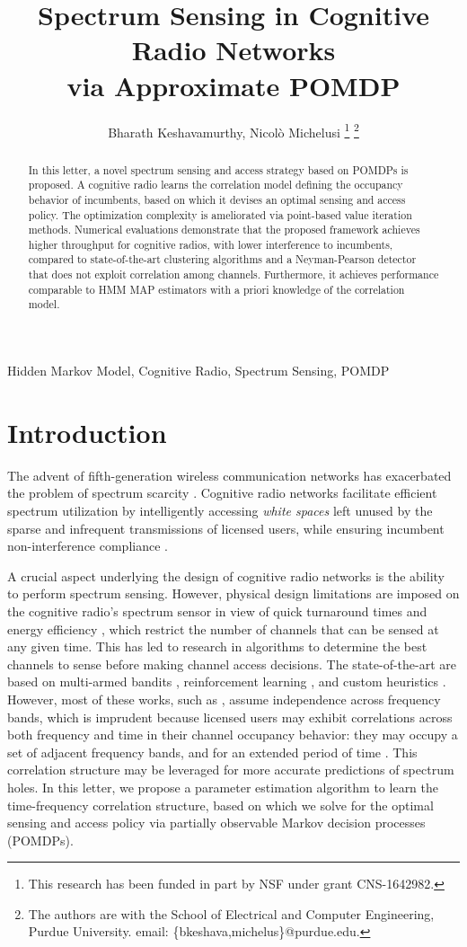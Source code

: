 \documentclass[10pt,twocolumn]{IEEEtran}
\title{Spectrum Sensing in Cognitive Radio Networks
\\
via Approximate POMDP}
\author{Bharath Keshavamurthy, Nicol\`{o} Michelusi
\thanks{This research has been funded in part by NSF under grant CNS-1642982.}
\thanks{The authors are with the School of Electrical and Computer Engineering, Purdue University. email: \{bkeshava,michelus\}@purdue.edu.}
\vspace{-12mm}}
\begin{document}
\maketitle
\thispagestyle{empty}
\pagestyle{empty} 
\begin{abstract}
In this letter, a novel spectrum sensing and access strategy based on POMDPs is proposed. A cognitive radio learns the correlation model defining the occupancy behavior of incumbents, based on which it devises an optimal sensing and access policy. The optimization complexity is ameliorated via point-based value iteration methods. Numerical evaluations demonstrate that the proposed framework achieves higher throughput for cognitive radios, with lower interference to incumbents, compared to state-of-the-art clustering algorithms and a Neyman-Pearson detector that does not exploit correlation among channels. Furthermore, it achieves performance comparable to HMM MAP estimators with a priori knowledge of the correlation model.
\end{abstract}
\vspace{-4mm}
\begin{IEEEkeywords}
Hidden Markov Model, Cognitive Radio, Spectrum Sensing, POMDP
\end{IEEEkeywords}
\vspace{-4mm}
\section{Introduction}\label{I}
The advent of fifth-generation wireless communication networks has exacerbated the problem of spectrum scarcity \cite{7158089}. Cognitive radio networks facilitate efficient spectrum utilization by intelligently accessing \emph{white spaces} left unused by the sparse and infrequent transmissions of licensed users, while ensuring incumbent non-interference compliance \cite{4562537}. 

A crucial aspect underlying the design of cognitive radio networks is the ability to perform spectrum sensing. However, physical design limitations are imposed on the cognitive radio's spectrum sensor in view of quick turnaround times and energy efficiency \cite{5990482}, which restrict the number of channels that can be sensed at any given time. This has led to research in algorithms to determine the best channels to sense before making channel access decisions. The state-of-the-art are based on multi-armed bandits \cite{7094730}, reinforcement learning \cite{6507570}, and custom heuristics \cite{4554696, 6956794}. However, most of these works, such as \cite{7094730, 6507570, 7895211, 7336513, 8571293}, assume independence across frequency bands, which is imprudent because licensed users may exhibit correlations across both frequency and time in their channel occupancy behavior: they may occupy a set of adjacent frequency bands, and for an extended period of time \cite{6188346}. This correlation structure may be leveraged for more accurate predictions of spectrum holes. In this letter, we propose a parameter estimation algorithm to learn the time-frequency correlation structure, based on which we solve for the optimal sensing and access policy via partially observable Markov decision processes (POMDPs).
\end{document}
